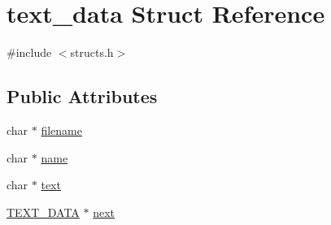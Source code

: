 \hypertarget{structtext__data}{\section{text\-\_\-data Struct Reference}
\label{structtext__data}
}


{\ttfamily \#include $<$structs.\-h$>$}

\subsection*{Public Attributes}
\begin{DoxyCompactItemize}
\item 
char $\ast$ \hyperlink{structtext__data_ab5ba1f2ba85ead4797f8d96eaec6ecc6}{filename}
\item 
char $\ast$ \hyperlink{structtext__data_a3f5426e1540802213102e386ce97bbf0}{name}
\item 
char $\ast$ \hyperlink{structtext__data_a2fac5a089d89f9333afef2c7ec68d1c4}{text}
\item 
\hyperlink{structs_8h_a0c3831e932a5072abea2d808d7085561}{T\-E\-X\-T\-\_\-\-D\-A\-T\-A} $\ast$ \hyperlink{structtext__data_a8f86e505ae21c67e5fb2212a1f7fc0f4}{next}
\end{DoxyCompactItemize}


